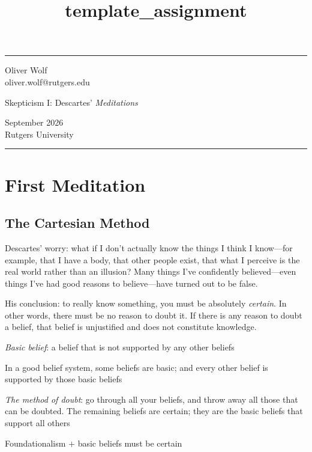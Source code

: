 \documentclass[english, a4paper]{article}
\begin{document}

\title{template_assignment} %
\fancyhead[C]{}
\hrule \medskip %
\begin{minipage}{0.24\textwidth} %
\raggedright
Oliver Wolf\\[6pt] %
oliver.wolf@rutgers.edu
\end{minipage}
\begin{minipage}{0.5\textwidth} %
\centering 
\large %
Skepticism I: Descartes' \textit{Meditations}
\\ %
\normalsize %
\emph{} %
\end{minipage}
\begin{minipage}{0.24\textwidth} %
 September 2026\\[6pt] %
Rutgers University %
\end{minipage}
\medskip\hrule %
\bigskip


\section{First Meditation}

\subsection*{The Cartesian Method}

Descartes' worry: what if I don't actually know the things I think I know---for example, that I have a body, that other people exist, that what I perceive is the real world rather than an illusion? Many things I've confidently believed---even things I've had good reasons to believe---have turned out to be false. 

His conclusion: to really know something, you must be absolutely \textit{certain}. In other words, there must be no reason to doubt it. If there is any reason to doubt a belief, that belief is unjustified and does not constitute knowledge.

\begin{description}
	\item \emph{Basic belief}: a belief that is not supported by any other beliefs
	
	\item[Foundationalism]  In a good belief system, some beliefs are basic; and every other belief is supported by those basic beliefs
	
	\item \emph{The method of doubt}:  go through all your beliefs, and throw away all those that can be doubted.  The remaining beliefs are certain; they are the basic beliefs that support all others
	
	\item[Descartes's Foundationalism]  Foundationalism $+$ basic beliefs must be certain
\end{description}
\end{document}
